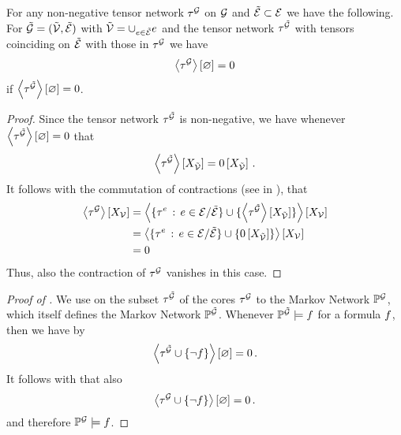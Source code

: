 \begin{lemma}
    \label{lem:monotocityOfVanishingContractions}
    For any non-negative tensor network $\tau^{\mathcal{G}}$ on $\mathcal{G}$ and $\tilde{\mathcal{E}}\subset\mathcal{E}$ we have the following.
    For $\tilde{\mathcal{G}}=(\tilde{\mathcal{V}},\tilde{\mathcal{E}})$ with $\tilde{\mathcal{V}}=\cup_{e\in\tilde{\mathcal{E}}}e$ and the tensor network $\tau^{\tilde{\mathcal{G}}}$ with tensors coinciding on $\tilde{\mathcal{E}}$ with those in $\tau^{\mathcal{G}}$ we have
    \begin{align*}
        \left\langle \tau^{\mathcal{G}}\right\rangle \left[ \varnothing \right] = 0
    \end{align*}
    if $\left\langle \tau^{\tilde{\mathcal{G}}}\right\rangle \left[ \varnothing \right]=0$.
\end{lemma}
\begin{proof}
    Since the tensor network $\tau^{\tilde{\mathcal{G}}}$ is non-negative, we have whenever $\left\langle \tau^{\tilde{\mathcal{G}}}\right\rangle \left[ \varnothing \right]=0$ that
    \begin{align*}
        \left\langle \tau^{\tilde{\mathcal{G}}}\right\rangle \left[ X_{\tilde{\mathcal{V}}} \right] = 0\left[X_{\tilde{\mathcal{V}}}\right] \, .
    \end{align*}
    It follows with the commutation of contractions (see  in ), that
    \begin{align*}
        \left\langle \tau^{\mathcal{G}}\right\rangle \left[ X_{\mathcal{V}} \right]
        &= \left\langle 
            \{\tau^{e} \, : \, e\in\mathcal{E}/\tilde{\mathcal{E}}\}
            \cup \{\left\langle \tau^{\tilde{\mathcal{G}}}\right\rangle \left[ X_{\tilde{\mathcal{V}}} \right]\}
        \right\rangle \left[ X_{\mathcal{V}} \right] \\
        &=    \left\langle 
            \{\tau^{e} \, : \, e\in\mathcal{E}/\tilde{\mathcal{E}}\}
            \cup \{0\left[X_{\tilde{\mathcal{V}}}\right]\}
        \right\rangle \left[ X_{\mathcal{V}} \right] \\
        &= 0
    \end{align*}
    Thus, also the contraction of $\tau^{\mathcal{G}}$ vanishes in this case.
\end{proof}

\begin{proof}[Proof of ]
    We use  on the subset $\tau^{\tilde{\mathcal{G}}}$ of the cores $\tau^{\mathcal{G}}$ to the Markov Network $\mathbb{P}^{\mathcal{G}}$, which itself defines the Markov Network $\mathbb{P}^{\tilde{\mathcal{G}}}$.
    Whenever $\mathbb{P}^{\tilde{\mathcal{G}}}\models f$ for a formula $f$, then we have by 
    \begin{align*}
        \left\langle \tau^{\tilde{\mathcal{G}}} \cup\{\lnot f\}\right\rangle \left[ \varnothing \right] = 0 \, .
    \end{align*}
    It follows with  that also
    \begin{align*}
        \left\langle \tau^{\mathcal{G}} \cup\{\lnot f\}\right\rangle \left[ \varnothing \right] = 0 \, .
    \end{align*}
    and therefore $\mathbb{P}^{\mathcal{G}}\models f$.
\end{proof}


